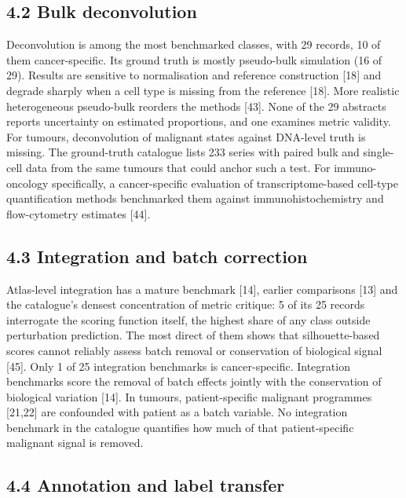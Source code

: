 \documentclass{article}
\begin{document}
\subsection{4.2 Bulk deconvolution}\label{bulk-deconvolution}

Deconvolution is among the most benchmarked classes, with 29 records, 10
of them cancer-specific. Its ground truth is mostly pseudo-bulk
simulation (16 of 29). Results are sensitive to normalisation and
reference construction {[}18{]} and degrade sharply when a cell type is
missing from the reference {[}18{]}. More realistic heterogeneous
pseudo-bulk reorders the methods {[}43{]}. None of the 29 abstracts
reports uncertainty on estimated proportions, and one examines metric
validity. For tumours, deconvolution of malignant states against
DNA-level truth is missing. The ground-truth catalogue lists 233 series
with paired bulk and single-cell data from the same tumours that could
anchor such a test. For immuno-oncology specifically, a cancer-specific
evaluation of transcriptome-based cell-type quantification methods
benchmarked them against immunohistochemistry and flow-cytometry
estimates {[}44{]}.

\subsection{4.3 Integration and batch correction}\label{integration-and-batch-correction}

Atlas-level integration has a mature benchmark {[}14{]}, earlier
comparisons {[}13{]} and the catalogue's densest concentration of metric
critique: 5 of its 25 records interrogate the scoring function itself,
the highest share of any class outside perturbation prediction. The most
direct of them shows that silhouette-based scores cannot reliably assess
batch removal or conservation of biological signal {[}45{]}. Only 1 of
25 integration benchmarks is cancer-specific. Integration benchmarks
score the removal of batch effects jointly with the conservation of
biological variation {[}14{]}. In tumours, patient-specific malignant
programmes {[}21,22{]} are confounded with patient as a batch variable.
No integration benchmark in the catalogue quantifies how much of that
patient-specific malignant signal is removed.

\subsection{4.4 Annotation and label transfer}\label{annotation-and-label-transfer}
\end{document}
